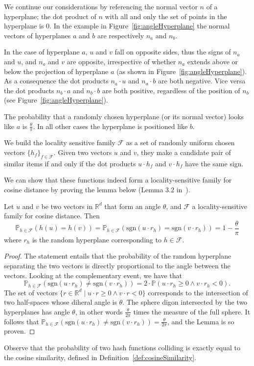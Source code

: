 We continue our considerations by referencing the normal vector $n$ of a hyperplane; the dot product of $n$ with all and only the set of points in the hyperplane is $0$. In the example in Figure~\ref{fig:angleHyperplane} the normal vectors of hyperplanes $a$ and $b$ are respectively $n_a$ and $n_b$.

In the case of hyperplane $a$, $u$ and $v$ fall on opposite sides, thus the signs of $n_a$ and $u$, and $n_a$ and $v$ are opposite, irrespective of whether $n_a$ extends above or below the projection of hyperplane $a$ (as shown in Figure~\ref{fig:angleHyperplane}). As a consequence the dot products $n_a\cdot u$ and $n_a\cdot b$ are both negative. Vice versa the dot products $n_b\cdot a$ and $n_b\cdot b$ are both positive, regardless of the position of $n _b$ (see Figure~\ref{fig:angleHyperplane}).

The probability that a randomly chosen hyperplane (or its normal vector) looks like $a$ is $\frac{\theta}{\pi}$. In all other cases the hyperplane is positioned like $b$.

\medskip
We build the locality sensitive family $\mathcal{F}$ as a set of randomly uniform chosen vectors $\{h_f\}_{f\in\mathcal{F}}$. Given two vectors $u$ and $v$, they make a candidate pair of similar items if and only if the dot products $u\cdot h_f$ and $v \cdot h_f$ have the same sign.

We can show that these functions indeed form a locality-sensitive family for cosine distance by proving the lemma below (Lemma 3.2 in~\cite{Goesman1995ImprovedApproximationMAXCUT}).

\begin{lemma}
    Let $u$ and $v$ be two vectors in $\mathbb{R}^d$ that form an angle $\theta$, and $\mathcal{F} $ a locality-sensitive family for cosine distance. Then
    $$\mathbb{P}_{h\in\mathcal{F}}(h(u)=h(v))=\mathbb{P}_{h\in\mathcal{F}}(\text{sgn}(u\cdot r_h)=\text{sgn}(v\cdot r_h))=1-\frac{\theta}{\pi}$$    
    where $r_h$ is the random hyperplane corresponding to $h \in \mathcal{F}$.
    \begin{proof}
        The statement entails that the probability of the random hyperplane separating the two vectors is directly proportional to the angle between the vectors. Looking at the complementary event, we have that
        $$\mathbb{P}_{h\in\mathcal{F}}(\text{sgn}(u\cdot r_h)\neq\text{sgn}(v\cdot r_h)) = 2\cdot \mathbb{P}(u\cdot r_h \geq 0 \land v\cdot r_h <0).$$
        The set of vectors $\{r \in \mathbb{R}^d\mid u\cdot r \geq 0 \land v\cdot r<0\}$ corresponds to the intersection of two half-spaces whose diheral angle is $\theta$. The sphere digon intersected by the two hyperplanes has angle $\theta$, in other words $\frac{\theta}{2\pi}$ times the measure of the full sphere. It follows that $\mathbb{P}_{h\in\mathcal{F}}(\text{sgn}(u\cdot r_h)\neq\text{sgn}(v\cdot r_h))=\frac{\theta}{2\pi}$, and the Lemma is so proven.
    \end{proof}
\end{lemma}
Observe that the probability of two hash functions colliding is exactly equal to the cosine similarity, defined in Definition~\ref{def:cosineSimilarity}.

